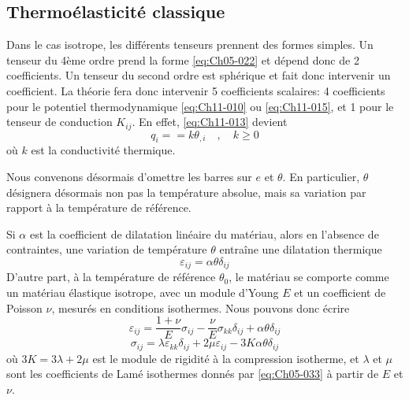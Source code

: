 \subsection{Thermoélasticité classique}\label{ssec:Ch11-1.2} 
Dans le cas isotrope, les différents tenseurs prennent des formes simples.
Un tenseur du 4ème ordre prend la forme \eqref{eq:Ch05-022} et dépend donc de 2 coefficients.
Un tenseur du second ordre est sphérique et fait donc intervenir un coefficient.
La théorie fera donc intervenir 5 coefficients scalaires: 4 coefficients pour le potentiel thermodynamique \eqref{eq:Ch11-010} ou \eqref{eq:Ch11-015}, et 1 pour le tenseur de conduction $K_{ij}$.
En effet, \eqref{eq:Ch11-013} devient
\begin{equation}
    q_i = =k \theta_{,i} \quad , \quad k \geq 0
    \label{eq:Ch11-018}
\end{equation}
où $k$ est la conductivité thermique. 

Nous convenons désormais d'omettre les barres sur $e$ et $\theta$.
En particulier, $\theta$ désignera désormais non pas la température absolue, mais sa variation par rapport à la température de référence. 

Si $\alpha$ est la coefficient de dilatation linéaire du matériau, alors en l'absence de contraintes, une variation de température $\theta$ entraîne une dilatation thermique 
\begin{equation}
    \varepsilon_{ij} = \alpha \theta \delta_{ij}
    \label{eq:Ch11-019}
\end{equation}
D'autre part, à la température de référence $\theta_0$, le matériau se comporte comme un matériau élastique isotrope, avec un module d'Young $E$ et un coefficient de Poisson $\nu$, mesurés en conditions isothermes.
Nous pouvons donc écrire 
\begin{equation}
    \varepsilon_{ij} = \frac{1+\nu}{E}\sigma_{ij} - \frac{\nu}{E}\sigma_{kk}\delta_{ij} + \alpha \theta \delta_{ij}
    \label{eq:Ch11-020}
\end{equation}
\begin{equation}
    \sigma_{ij} = \lambda \varepsilon_{kk} \delta_{ij} + 2 \mu \varepsilon_{ij} -3 K \alpha \theta \delta_{ij}
    \label{eq:Ch11-021}
\end{equation}
où $ 3 K = 3 \lambda + 2 \mu $ est le module de rigidité à la compression isotherme, et $\lambda$ et $\mu$ sont les coefficients de Lamé isothermes donnés par \eqref{eq:Ch05-033} à partir de $E$ et $\nu$.

